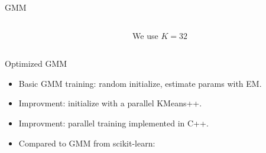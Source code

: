 \begin{frame}{GMM}
\begin{columns}
\begin{column}{0.5\textwidth}
\begin{center}
      \end{center}
    \end{column}
    \begin{column}{0.3\textwidth}
      We use $ K=32$
    \end{column}
  \end{columns}
\end{frame}

\begin{frame}{Optimized GMM}
  \begin{itemize}
    \item Basic GMM training: random initialize, estimate params with EM.
    \item Improvment: initialize with a parallel KMeans++.
    \item Improvment: parallel training implemented in C++.
    \item Compared to GMM from scikit-learn:
  \end{itemize}


\end{frame}
